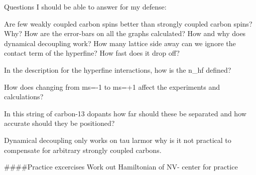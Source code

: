 Questions I should be able to answer for my defense:

Are few weakly coupled carbon spins better than strongly coupled carbon spins? Why?
How are the error-bars on all the graphs calculated?
How and why does dynamical decoupling work?
How many lattice side away can we ignore the contact term of the hyperfine? How fast does it drop off?

In the description for the hyperfine interactions, how is the n_hf defined?

How does changing from ms=-1 to ms=+1 affect the experiments and calculations?

In this string of carbon-13  dopants how far should these be separated and how accurate should they be positioned?

Dynamical decoupling only works on tau larmor
why is it not practical to compensate for arbitrary strongly coupled carbons.



####Practice excercises
Work out Hamiltonian of NV- center for practice
